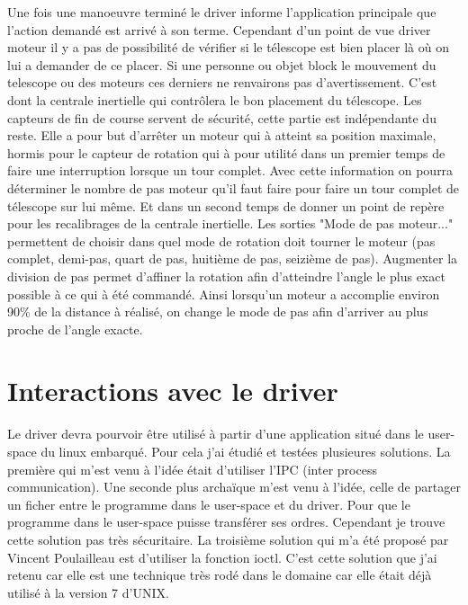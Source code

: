 Une fois une manoeuvre terminé le driver informe l'application principale que l'action demandé est arrivé à son terme. Cependant d'un point de vue driver moteur il y a pas de possibilité de vérifier si le télescope est bien placer là où on lui a demander de ce placer. Si une personne ou objet block le mouvement du telescope ou des moteurs ces derniers ne renvairons pas d'avertissement. C'est dont la centrale inertielle qui contrôlera le bon placement du télescope. \newline
Les capteurs de fin de course servent de sécurité, cette partie est indépendante du reste. Elle a pour but d'arrêter un moteur qui à atteint sa position maximale, hormis pour le capteur de rotation qui à pour utilité dans un premier temps de faire une interruption lorsque un tour complet. \newline Avec cette information on pourra déterminer le nombre de pas moteur qu'il faut faire pour faire un tour complet de télescope sur lui même. Et dans un second temps de donner un point de repère pour les recalibrages de la centrale inertielle. \newline 
Les sorties "Mode de pas moteur..." permettent de choisir dans quel mode de rotation doit tourner le moteur (pas complet, demi-pas, quart de pas, huitième de pas, seizième de pas). Augmenter la division de pas permet d’affiner la rotation afin d’atteindre l’angle le plus exact possible à ce qui à été commandé. Ainsi lorsqu'un moteur a accomplie environ 90\% de la distance à réalisé, on change le mode de pas afin d'arriver au plus proche de l'angle exacte.   



\section{Interactions avec le driver}

Le driver devra pourvoir être utilisé à partir d'une application situé dans le user-space du linux embarqué. Pour cela j'ai étudié et testées plusieures solutions. \newline
La première qui m'est venu à l'idée était d'utiliser l'IPC (inter process communication). \newline
Une seconde plus archaïque m'est venu à l'idée, celle de partager un ficher entre le programme dans le user-space et du driver. Pour que le programme dans le user-space puisse transférer ses ordres. Cependant je trouve cette solution pas très sécuritaire. \newline
La troisième solution qui m'a été proposé par Vincent Poulailleau est d'utiliser la fonction ioctl. C'est cette solution que j'ai retenu car elle est une technique très rodé dans le domaine car elle était déjà utilisé à la version 7 d'UNIX. 
\vspace{1cm}

